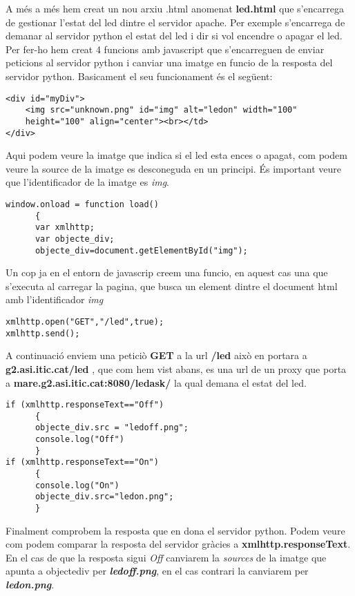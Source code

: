 \documentclass[11p]{article}
\begin{document}
A més a més hem creat un nou arxiu .html anomenat \textbf{led.html} que s'encarrega de gestionar l'estat del led dintre el servidor apache. Per exemple s'encarrega de demanar al servidor python el estat del led i dir si vol encendre o apagar el led. Per fer-ho hem creat 4 funcions amb javascript que s'encarreguen de enviar peticions al servidor python i canviar una imatge en funcio de la resposta del servidor python. Basicament el seu funcionament és el següent:
\newline
\begin{lstlisting}
<div id="myDiv">
	<img src="unknown.png" id="img" alt="ledon" width="100" 
	height="100" align="center"><br></td>
</div>
\end{lstlisting}
Aqui podem veure la imatge que indica si el led esta ences o apagat, com podem veure la source de la imatge es desconeguda en un principi. És important veure que l'identificador de la imatge es \textit{img}.
\newline
\begin{lstlisting}
window.onload = function load()
      {
      var xmlhttp;
      var objecte_div;
      objecte_div=document.getElementById("img");
\end{lstlisting}
Un cop ja en el entorn de javascrip creem una funcio, en aquest cas una que s'executa al carregar la pagina, que busca un element dintre el document html amb l'identificador \textit{img}
\newline
\begin{lstlisting}
xmlhttp.open("GET","/led",true);
xmlhttp.send();
\end{lstlisting}
A continuació enviem una peticiò \textbf{GET} a la url \textbf{/led} això en portara a \textbf{g2.asi.itic.cat/led} , que com hem vist abans, es una url de un proxy que porta a \textbf{mare.g2.asi.itic.cat:8080/led\textunderscore ask/} la qual demana el estat del led.
\newline
\begin{lstlisting}
if (xmlhttp.responseText=="Off")
      {
      objecte_div.src = "ledoff.png";
      console.log("Off")
      }
if (xmlhttp.responseText=="On")
      {
      console.log("On")
      objecte_div.src="ledon.png";
      }
\end{lstlisting}
Finalment comprobem la resposta que en dona el servidor python. Podem veure com podem comparar la resposta del servidor gràcies a \textbf{xmlhttp.responseText}. En el cas de que la resposta sigui \textit{Off} canviarem la \textit{sources} de la imatge que apunta a objecte\textunderscore div per \textbf{\textit{ledoff.png}}, en el cas contrari la canviarem per \textbf{\textit{ledon.png}}.
\end{document}
